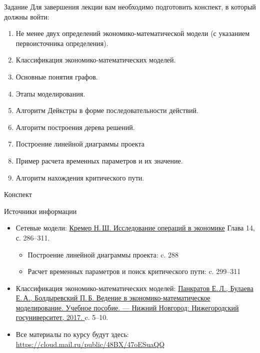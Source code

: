 \documentclass[unicode,11pt,notheorems]{beamer}
\begin{document}
\begin{frame}{Задание}
Для завершения лекции вам необходимо подготовить конспект, в который должны войти:
	\begin{enumerate}
		\item 
			 Не менее двух определений экономико-математической модели (с указанием первоисточника определения).
		\item 
			 Классификация экономико-математических моделей.
		\item 
			 Основные понятия графов.
		\item 
			  Этапы моделирования.
		\item 
			 Алгоритм Дейкстры в форме последовательности действий.
		\item 
			 Алгоритм построения дерева решений.
		\item 
			 Построение линейной диаграммы проекта 
		\item 
			 Пример расчета временных параметров и их значение.
		\item 
			 Алгоритм нахождения критического пути.
	\end{enumerate}

Конспект

\end{frame}
\begin{frame}{Источники информации}
\begin{itemize}
\item 
	Сетевые модели:  {\color{blue}\href{https://cloud.mail.ru/public/4SN3/2MJYgEz95}{Кремер  Н.\,Ш. Исследование операций в экономике}} Глава 14, с. 286--311.
	\begin{itemize}
		\item  
			Построение линейной диаграммы проекта: c. 288
		\item 
			 Расчет временных параметров и поиск критического пути:  c. 299--311
	\end{itemize}
\item 
	Классификация экономико-математических моделей: 	
	{\color{blue}\href{https://cloud.mail.ru/public/4WWa/4qH2ceM1H}{Панкратов Е.\,Л., Булаева Е.\,А., Болдыревский П.\,Б. Ведение в экономико-математическое моделирование. Учебное пособие. --- Нижний Новгород: Нижегородский госуниверситет, 2017. }} c. 5--10.
\item Все материалы по курсу будут здесь:
{\color{blue}\url{https://cloud.mail.ru/public/48BX/47oESuaQQ}}

\end{itemize}

\end{frame}
\end{document}
